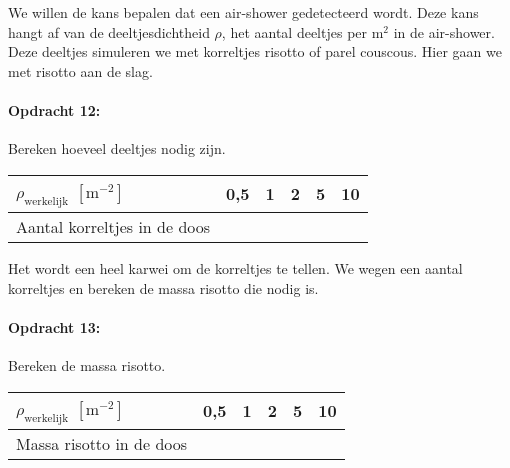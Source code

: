 We willen de kans bepalen dat een air-shower gedetecteerd wordt. Deze
kans hangt af van de deeltjesdichtheid $\rho$, het aantal deeltjes
per $\mathrm{m^{2}}$ in de air-shower. Deze deeltjes simuleren we
met korreltjes risotto of parel couscous. Hier gaan we met risotto aan de slag.

\begin{minipage}[t]{1\columnwidth}%

\paragraph{Opdracht 12:}

Bereken hoeveel deeltjes nodig zijn.

\bigskip{}

\begin{tabular}{|x{.3\textwidth}|x{.1\textwidth}|x{.1\textwidth}
                |x{.1\textwidth}|x{.1\textwidth}|x{.1\textwidth}|}
    \hline
    $\rho_\textrm{werkelijk}$ $\left[\mathrm{m^{-2}}\right]$ & 0,5 & 1 & 2 & 5 & 10 \\
    \hline
    Aantal korreltjes in de doos &  &  &  &  & \\
    \hline
    \end{tabular}%
\end{minipage}

\bigskip{}
Het wordt een heel karwei om de korreltjes te tellen. We wegen een
aantal korreltjes en bereken de massa risotto die nodig is.

\begin{minipage}[t]{1\columnwidth}%

\paragraph{Opdracht 13:}

Bereken de massa risotto.

\bigskip{}

\begin{tabular}{|x{.3\textwidth}|x{.1\textwidth}|x{.1\textwidth}
                |x{.1\textwidth}|x{.1\textwidth}|x{.1\textwidth}|}
    \hline
    $\rho_\textrm{werkelijk}$ $\left[\mathrm{m^{-2}}\right]$ & 0,5 & 1 & 2 & 5 & 10 \\
    \hline
    Massa risotto in de doos &  &  &  &  & \\
    \hline
\end{tabular}
\end{minipage}

\bigskip{}


